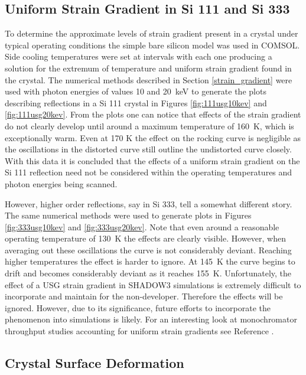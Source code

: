 \documentclass[preprint]{iucr}              %
\begin{document}
\subsection{Uniform Strain Gradient in Si 111 and Si 333}\label{strain_results}

To determine the approximate levels of strain gradient present in a crystal under typical operating conditions the simple bare silicon model was used in COMSOL. Side cooling temperatures were set at intervals with each one producing a solution for the extremum of temperature and uniform strain gradient found in the crystal. The numerical methods described in Section \ref{strain_gradient} were used with photon energies of values 10 and 20~keV to generate the plots describing reflections in a Si 111 crystal in Figures \ref{fig:111usg10kev} and \ref{fig:111usg20kev}. From the plots one can notice that effects of the strain gradient do not clearly develop until around a maximum temperature of 160~K, which is exceptionally warm. Even at 170 K the effect on the rocking curve is negligible as the oscillations in the distorted curve still outline the undistorted curve closely. With this data it is concluded that the effects of a uniform strain gradient on the Si 111 reflection need not be considered within the operating temperatures and photon energies being scanned.

However, higher order reflections, say in Si 333, tell a somewhat different story. The same numerical methods were used to generate plots in Figures \ref{fig:333usg10kev} and \ref{fig:333usg20kev}. Note that even around a reasonable operating temperature of 130~K the effects are clearly visible. However, when averaging out these oscillations the curve is not considerably deviant. Reaching higher temperatures the effect is harder to ignore. At 145~K the curve begins to drift and becomes considerably deviant as it reaches 155~K. Unfortunately, the effect of a USG strain gradient in SHADOW3 simulations is extremely difficult to incorporate and maintain for the non-developer. Therefore the effects will be ignored. However, due to its significance, future efforts to incorporate the phenomenon into simulations is likely. For an interesting look at monochromator throughput studies accounting for uniform strain gradients see Reference \cite{mocellaUSG}.

\subsection{Crystal Surface Deformation}\label{deformation}
\end{document}
